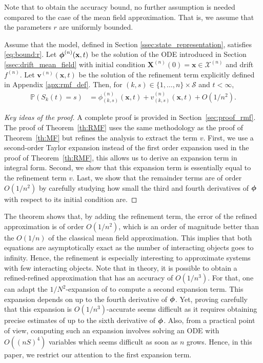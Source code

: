 \documentclass[acmsmall]{acmart}
\newcommand\bx{\mathbf{x}}
\newcommand\bX{\mathbf{X}}
\newcommand\bv{\mathbf{v}}
\newcommand\bphi{\text{\boldmath$\phi$}}
\newcommand\calX{\mathcal{X}}
\newcommand\calS{\mathcal{S}}
\newcommand\toN{^{(n)}}
\newcommand\Proba[1]{\mathbb{P}\left(#1\right)} %
\begin{document}
Note that to obtain the accuracy bound, no further assumption is needed compared to the case of the mean field approximation. That is, we assume that the parameters $r$ are uniformly bounded.
\begin{theorem}
  \label{th:RMF}
  Assume that the model, defined in Section \ref{ssec:state_representation}, satisfies \eqref{eq:bound:r}. Let $\bphi\toN(\bx, t)$ be the solution of the ODE introduced in Section \ref{ssec:drift_mean_field} with initial condition $\bX\toN(0) = \bx \in \calX\toN$ and drift $f\toN$. Let $\bv\toN(\bx, t)$ be the solution of the refinement term explicitly defined in Appendix \ref{apx:rmf_def}. Then, for $(k,s)\in \{1,\ldots,n\}\times \calS$ and $t < \infty$,
  \begin{align}
    \label{eq:RMF_theorem}
    \Proba{S_k(t)=s } & = \phi\toN_{(k,s)}(\bx,t) + v\toN_{(k,s)}(\bx,t) + O(1/n^2).
  \end{align}
\end{theorem}
\color{black}
\begin{proof}[Key ideas of the proof]
  A complete proof is provided in Section~\ref{sec:proof_rmf}. The proof of Theorem~\ref{th:RMF} uses the same methodology as the proof of Theorem~\ref{th:MF} but refines the analysis to extract the term $v$. First, we use a second-order Taylor expansion instead of the first order expansion used in the proof of Theorem~\ref{th:RMF}, this allows us to derive an expansion term in integral form. Second, we show that this expansion term is essentially equal to the refinement term $v$. Last, we show that the remainder terms are of order $O(1/n^2)$ by carefully studying how small the third and fourth derivatives of $\bphi$ with respect to its initial condition are.
\end{proof}

The theorem shows that, by adding the refinement term, the error of the refined approximation is of order $O(1/n^2)$, which is an order of magnitude better than the $O(1/n)$ of the classical mean field approximation. This implies that both equations are asymptotically exact as the number of interacting objects goes to infinity. Hence, the refinement is especially interesting to approximate systems with few interacting objects. Note that in theory, it is possible to obtain a refined-refined approximation that has an accuracy of $O(1/n^3)$. For that, one can adapt the $1/N^2$-expansion of \cite{gastSizeExpansionsMean2019} to compute a second expansion term. This expansion depends on up to the fourth derivative of $\bphi$. Yet, proving carefully that this expansion is $O(1/n^3)$-accurate seems difficult as it requires obtaining precise estimates of up to the sixth derivative of $\bphi$. Also, from a practical point of view, computing such an expansion involves solving an ODE with $O((nS)^4)$ variables which seems difficult as soon as $n$ grows. Hence, in this paper, we restrict our attention to the first expansion term.
\end{document}
